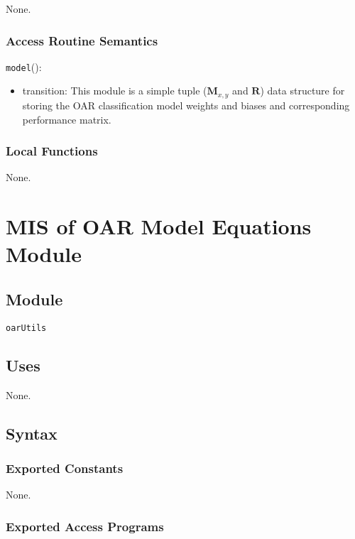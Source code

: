 \documentclass[12pt, titlepage]{article}
\def\code#1{\texttt{#1}}
\begin{document}
None.

\subsubsection{Access Routine Semantics}

\noindent \code{model}():
\begin{itemize}
\item transition: This module is a simple tuple ($\mathbf{M}_{x,y}$ and $\mathbf{R}$) data structure for storing the OAR classification model weights and biases and corresponding performance matrix.
\end{itemize}

\subsubsection{Local Functions}

None.

\section{MIS of OAR Model Equations Module} \label{ModuleOME} 

\subsection{Module}

\code{oarUtils}

\subsection{Uses}

None.

\subsection{Syntax}

\subsubsection{Exported Constants}

None.

\subsubsection{Exported Access Programs}
\end{document}
